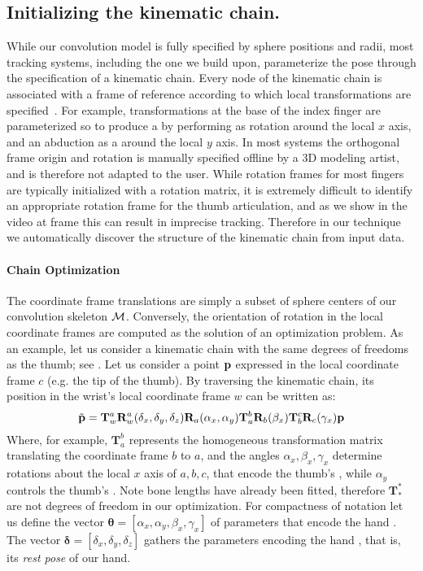 \subsection{Initializing the kinematic chain.}
While our convolution model is fully specified by sphere positions and radii, most tracking systems, including the one we build upon, parameterize the pose through the specification of a kinematic chain. Every node of the kinematic chain is associated with a frame of reference according to which local transformations are specified~\cite[Fig.2-(middle)]{tagliasacchi2015robust}. For example, transformations at the base of the index finger are parameterized so to produce a  by performing as rotation around the local $x$ axis, and an abduction as a  around the local $y$ axis. In most systems the orthogonal frame origin and rotation is manually specified offline by a 3D modeling artist, and is therefore not adapted to the user. 
% 
While rotation frames for most fingers are typically initialized with a rotation matrix, it is extremely difficult to identify an appropriate rotation frame for the thumb articulation, and as we show in the video at frame \todo{[00:00]} this can result in imprecise tracking. Therefore in our technique we automatically discover the structure of the kinematic chain from input data. 


\paragraph{Chain Optimization}
The coordinate frame translations are simply a subset of sphere centers of our convolution skeleton $\mathcal{M}$. Conversely, the orientation of rotation in the local coordinate frames are computed as the solution of an optimization problem. As an example, let us consider a kinematic chain with the same degrees of freedoms as the thumb; see . Let us consider a point $\mathbf{p}$ expressed in the local coordinate frame $c$ (e.g. the tip of the thumb). By traversing the kinematic chain, its position in the wrist's local coordinate frame $w$ can be written as:
% 
\begin{equation*}
\tilde{\mathbf{p}} = \mathbf{T}_w^a\mathbf{R}_w^a(\delta_x, \delta_y, \delta_z)
           \mathbf{R}_a(\alpha_x, \alpha_y) 
           \mathbf{T}_a^b \mathbf{R}_b(\beta_x) 
           \mathbf{T}_b^c \mathbf{R}_c(\gamma_x)
           \mathbf{p}
\label{eq:kinematic}
\end{equation*}
% 
Where, for example, $\mathbf{T}_a^b$ represents the homogeneous transformation matrix translating the coordinate frame $b$ to $a$, and the angles $\alpha_x, \beta_x, \gamma_x$ determine rotations about the local $x$ axis of $a, b, c$, that encode the thumb's , while $\alpha_y$ controls the thumb's . Note bone lengths have already been fitted, therefore $\mathbf{T}_*^*$ are not degrees of freedom in our optimization. For compactness of notation let us define the vector $\mathbf{\theta} = [\alpha_x, \alpha_y, \beta_x, \gamma_x ]$ of parameters that encode the hand . The vector $\mathbf{\delta} = [\delta_x, \delta_y, \delta_z]$ gathers the parameters encoding the hand , that is, its \emph{rest pose} of our hand. 

